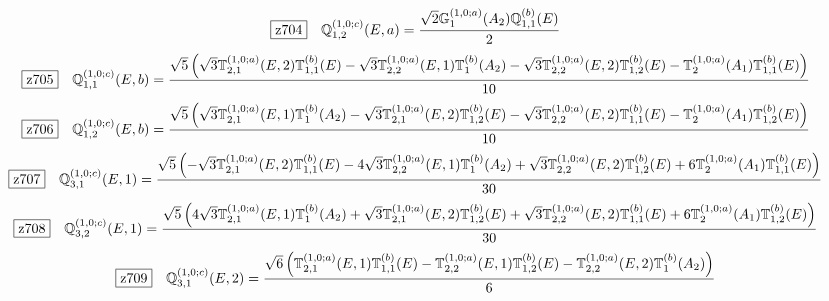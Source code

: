\documentclass[fleqn,10pt,landscape]{jsarticle}
\begin{document}
\begin{dmath*}
\hspace*{3mm}\fbox{z704}\quad \mathbb{Q}_{1,2}^{(1,0;c)}(E,a)=\frac{\sqrt{2} \mathbb{G}_{1}^{(1,0;a)}(A_{2}) \mathbb{Q}_{1,1}^{(b)}(E)}{2}
\end{dmath*}
\begin{dmath*}
\hspace*{3mm}\fbox{z705}\quad \mathbb{Q}_{1,1}^{(1,0;c)}(E,b)=\frac{\sqrt{5} \left(\sqrt{3} \mathbb{T}_{2,1}^{(1,0;a)}(E,2) \mathbb{T}_{1,1}^{(b)}(E) - \sqrt{3} \mathbb{T}_{2,2}^{(1,0;a)}(E,1) \mathbb{T}_{1}^{(b)}(A_{2}) - \sqrt{3} \mathbb{T}_{2,2}^{(1,0;a)}(E,2) \mathbb{T}_{1,2}^{(b)}(E) - \mathbb{T}_{2}^{(1,0;a)}(A_{1}) \mathbb{T}_{1,1}^{(b)}(E)\right)}{10}
\end{dmath*}
\begin{dmath*}
\hspace*{3mm}\fbox{z706}\quad \mathbb{Q}_{1,2}^{(1,0;c)}(E,b)=\frac{\sqrt{5} \left(\sqrt{3} \mathbb{T}_{2,1}^{(1,0;a)}(E,1) \mathbb{T}_{1}^{(b)}(A_{2}) - \sqrt{3} \mathbb{T}_{2,1}^{(1,0;a)}(E,2) \mathbb{T}_{1,2}^{(b)}(E) - \sqrt{3} \mathbb{T}_{2,2}^{(1,0;a)}(E,2) \mathbb{T}_{1,1}^{(b)}(E) - \mathbb{T}_{2}^{(1,0;a)}(A_{1}) \mathbb{T}_{1,2}^{(b)}(E)\right)}{10}
\end{dmath*}
\begin{dmath*}
\hspace*{3mm}\fbox{z707}\quad \mathbb{Q}_{3,1}^{(1,0;c)}(E,1)=\frac{\sqrt{5} \left(- \sqrt{3} \mathbb{T}_{2,1}^{(1,0;a)}(E,2) \mathbb{T}_{1,1}^{(b)}(E) - 4 \sqrt{3} \mathbb{T}_{2,2}^{(1,0;a)}(E,1) \mathbb{T}_{1}^{(b)}(A_{2}) + \sqrt{3} \mathbb{T}_{2,2}^{(1,0;a)}(E,2) \mathbb{T}_{1,2}^{(b)}(E) + 6 \mathbb{T}_{2}^{(1,0;a)}(A_{1}) \mathbb{T}_{1,1}^{(b)}(E)\right)}{30}
\end{dmath*}
\begin{dmath*}
\hspace*{3mm}\fbox{z708}\quad \mathbb{Q}_{3,2}^{(1,0;c)}(E,1)=\frac{\sqrt{5} \left(4 \sqrt{3} \mathbb{T}_{2,1}^{(1,0;a)}(E,1) \mathbb{T}_{1}^{(b)}(A_{2}) + \sqrt{3} \mathbb{T}_{2,1}^{(1,0;a)}(E,2) \mathbb{T}_{1,2}^{(b)}(E) + \sqrt{3} \mathbb{T}_{2,2}^{(1,0;a)}(E,2) \mathbb{T}_{1,1}^{(b)}(E) + 6 \mathbb{T}_{2}^{(1,0;a)}(A_{1}) \mathbb{T}_{1,2}^{(b)}(E)\right)}{30}
\end{dmath*}
\begin{dmath*}
\hspace*{3mm}\fbox{z709}\quad \mathbb{Q}_{3,1}^{(1,0;c)}(E,2)=\frac{\sqrt{6} \left(\mathbb{T}_{2,1}^{(1,0;a)}(E,1) \mathbb{T}_{1,1}^{(b)}(E) - \mathbb{T}_{2,2}^{(1,0;a)}(E,1) \mathbb{T}_{1,2}^{(b)}(E) - \mathbb{T}_{2,2}^{(1,0;a)}(E,2) \mathbb{T}_{1}^{(b)}(A_{2})\right)}{6}
\end{dmath*}
\end{document}
